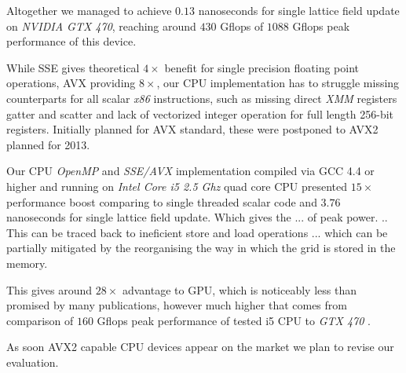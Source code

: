 \documentclass[11pt,a4paper]{article}
\begin{document}
Altogether we managed to achieve $0.13$ nanoseconds for single lattice
field update on \emph{NVIDIA GTX 470}, reaching around $430$ Gflops of
$1088$ Gflops peak performance of this device. 


While SSE gives theoretical $4\times$ benefit for single precision
floating point operations, AVX providing $8\times$, our CPU
implementation has to struggle missing counterparts for all scalar
\emph{x86} instructions, such as missing direct \emph{XMM} registers
gatter and scatter and lack of vectorized integer operation for full
length 256-bit registers. Initially planned for AVX standard, these
were postponed to AVX2 planned for 2013.


Our CPU \emph{OpenMP} and \emph{SSE/AVX} implementation compiled via
GCC 4.4 or higher and running on \emph{Intel Core i5 2.5 Ghz} quad
core CPU presented $15\times$ performance boost comparing to single
threaded scalar code and $3.76$ nanoseconds for single lattice field
update. Which gives the ... of peak power. .. This can be traced back
to ineficient store and load operations ... which can be partially
mitigated by the reorganising the way in which the grid is stored in
the memory. 

This gives around $28\times$ advantage to GPU, which is noticeably
less than promised by many publications, however much higher that
comes from comparison of $160$ Gflops peak performance of tested i5
CPU to \emph{GTX 470} \cite{Lee:2010:DGV:1816038.1816021}. 

As soon AVX2 capable CPU devices appear on the
market we plan to revise our evaluation.

{}

\end{document}
